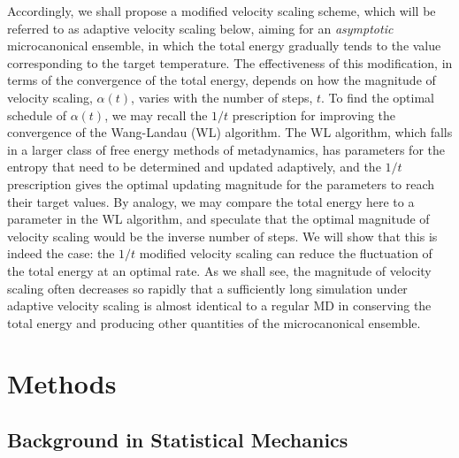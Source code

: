 \documentclass[reprint]{revtex4-1}
\begin{document}
Accordingly,
we shall propose a modified velocity scaling scheme,
which will be referred to as adaptive velocity scaling below,
aiming for an \emph{asymptotic} microcanonical ensemble,
in which
the total energy gradually tends to the value
corresponding to the target temperature.
%
The effectiveness of this modification,
in terms of the convergence of the total energy,
depends on how
the magnitude of velocity scaling, $\alpha(t)$,
varies with the number of steps, $t$.
%
To find the optimal schedule of $\alpha(t)$,
we may recall the $1/t$ prescription\cite{
  belardinelli2007, *belardinelli2007jcp, *belardinelli2008,
  zhou2005, *zhou2008, *morozov2007}
for improving the convergence of
the Wang-Landau (WL) algorithm\cite{
  wang2001, *wang2001pre}.
%
The WL algorithm,
which falls in a larger class of free energy methods
of metadynamics\cite{
  laio2002, laio2008, marsili2006},
has parameters for the entropy that need to be
determined and updated adaptively,
and the $1/t$ prescription gives the optimal updating magnitude
for the parameters to reach their target values.
%
By analogy, we may compare the total energy here
to a parameter in the WL algorithm,
and speculate that the optimal magnitude
of velocity scaling would be
the inverse number of steps.
%
We will show that this is indeed the case:
the $1/t$ modified velocity scaling can reduce
the fluctuation of the total energy
at an optimal rate.
%
%
As we shall see,
the magnitude of velocity scaling
often decreases so rapidly that
a sufficiently long simulation under adaptive velocity scaling
is almost identical to a regular MD
in conserving the total energy and producing other quantities
of the microcanonical ensemble.



\section{Methods}



\subsection{Background in Statistical Mechanics}
\end{document}
